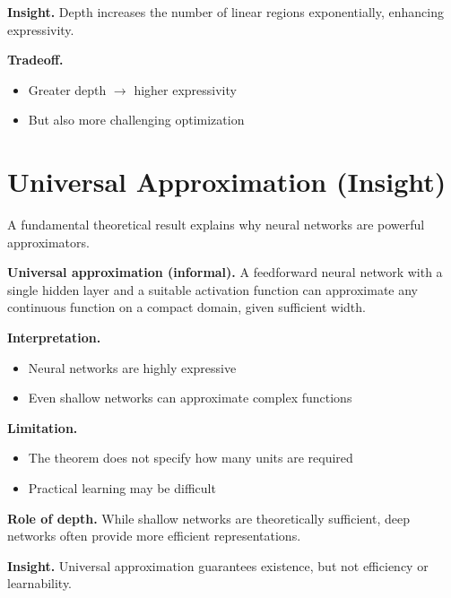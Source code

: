 \medskip

\noindent
\textbf{Insight.}  
Depth increases the number of linear regions exponentially, enhancing expressivity.

\medskip

\noindent
\textbf{Tradeoff.}
\begin{itemize}
    \item Greater depth $\rightarrow$ higher expressivity
    \item But also more challenging optimization
\end{itemize}

\section{Universal Approximation (Insight)}

A fundamental theoretical result explains why neural networks are powerful approximators.

\medskip

\noindent
\textbf{Universal approximation (informal).}  
A feedforward neural network with a single hidden layer and a suitable activation function can approximate any continuous function on a compact domain, given sufficient width.

\medskip

\noindent
\textbf{Interpretation.}
\begin{itemize}
    \item Neural networks are highly expressive
    \item Even shallow networks can approximate complex functions
\end{itemize}

\medskip

\noindent
\textbf{Limitation.}
\begin{itemize}
    \item The theorem does not specify how many units are required
    \item Practical learning may be difficult
\end{itemize}

\medskip

\noindent
\textbf{Role of depth.}  
While shallow networks are theoretically sufficient, deep networks often provide more efficient representations.

\medskip

\noindent
\textbf{Insight.}  
Universal approximation guarantees existence, but not efficiency or learnability.

